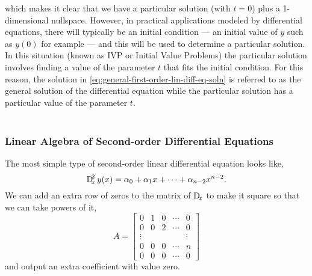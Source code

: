 \documentclass[../MathsNotesBase.tex]{subfiles}
\begin{document}
{		which makes it clear that we have a particular solution (with ${ t = 0 }$) plus a 1-dimensional nullspace. However, in practical applications modeled by differential equations, there will typically be an initial condition --- an initial value of $y$ such as $y(0)$ for example --- and this will be used to determine a particular solution. In this situation (known as IVP or Initial Value Problems) the particular solution involves finding a value of the parameter $t$ that fits the initial condition. For this reason, the solution in \autoref{eq:general-first-order-lin-diff-eq-soln} is referred to as the general solution of the differential equation while the particular solution has a particular value of the parameter $t$.\\\\
		
		\bigskip
		\subsubsection{Linear Algebra of Second-order Differential Equations}
		\bigskip
		The most simple type of second-order linear differential equation looks like,
		\begin{equation}\label{eq:eq:second-order-lin-diffeq}
			 \Dif_x^2 y(x) = \alpha_0 + \alpha_1 x + \cdots + \alpha_{n-2} x^{n-2}.
		\end{equation}
		We can add an extra row of zeros to the matrix of $\Dif_x$ to make it square so that we can take powers of it,
		\[ A = \begin{bmatrix}
				0 & 1 & 0 & \cdots & 0\\
				0 & 0 & 2 & \cdots & 0\\
				\vdots &  &  &  & \vdots\\
				0 & 0 & 0 & \cdots & n \\
				0 & 0 & 0 & \cdots & 0
				\end{bmatrix}
		\]
		and output an extra coefficient with value zero.\\
		
}
\end{document}

